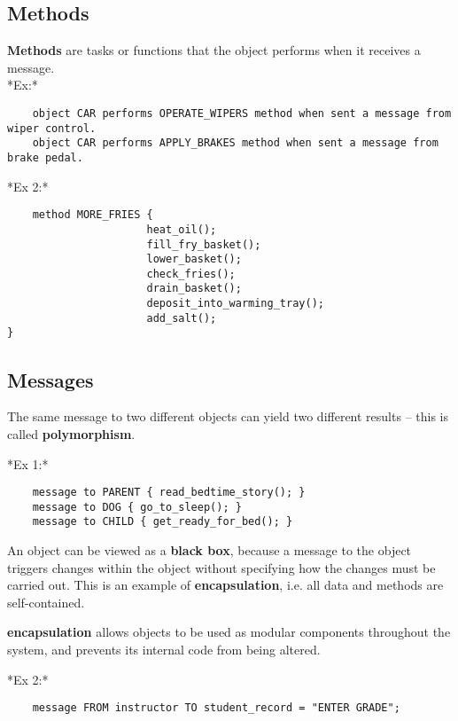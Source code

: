 \documentclass[12pt,a4paper]{article}
\begin{document}
\subsection{Methods}
\textbf{Methods} are tasks or functions that the object performs when it receives a message. \\
*Ex:*
\begin{verbatim}
    object CAR performs OPERATE_WIPERS method when sent a message from wiper control.
    object CAR performs APPLY_BRAKES method when sent a message from brake pedal.
\end{verbatim}
*Ex 2:*
\begin{verbatim}
    method MORE_FRIES {
                      heat_oil();
                      fill_fry_basket();
                      lower_basket();
                      check_fries();
                      drain_basket();
                      deposit_into_warming_tray();
                      add_salt();
}
\end{verbatim}

\subsection{Messages}
The same message to two different objects can yield two different results -- this is called \textbf{polymorphism}.

*Ex 1:*
\begin{verbatim}
    message to PARENT { read_bedtime_story(); }
    message to DOG { go_to_sleep(); }
    message to CHILD { get_ready_for_bed(); }
\end{verbatim}
An object can be viewed as a \textbf{black box}, because a message to the object triggers changes within the object without specifying how the changes must be carried out. This is an example of \textbf{encapsulation}, i.e. all data and methods are self-contained.

\textbf{encapsulation} allows objects to be used as modular components throughout the system, and prevents its internal code from being altered.

*Ex 2:*
\begin{verbatim}
    message FROM instructor TO student_record = "ENTER GRADE";
\end{verbatim}
\end{document}
